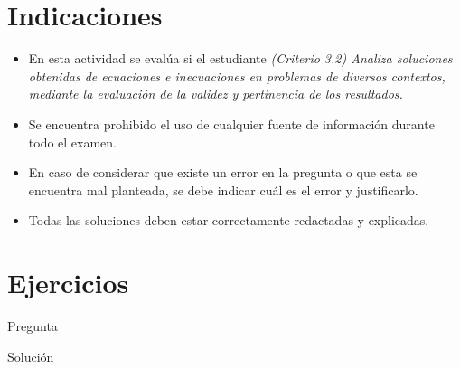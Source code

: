 \documentclass[11pt,a4]{aleph-examen}
\begin{document}
\encabezado

\section*{Indicaciones}
\begin{itemize}[leftmargin=*]
\item 
    En esta actividad se evalúa si el estudiante \textit{(Criterio 3.2) Analiza soluciones obtenidas de ecuaciones e inecuaciones en problemas de diversos contextos, mediante la evaluación de la validez y pertinencia de los resultados.} 
\item
    Se encuentra prohibido el uso de cualquier fuente de información durante todo el examen.
\item
    En caso de considerar que existe un error en la pregunta o que esta se encuentra mal planteada, se debe indicar cuál es el error y justificarlo.
\item
    Todas las soluciones deben estar correctamente redactadas y explicadas.
\end{itemize}

\section*{Ejercicios}

\begin{preguntas}

\item
    Pregunta

\begin{respuesta}
    Solución
\end{respuesta}


\end{preguntas}
\end{document}
